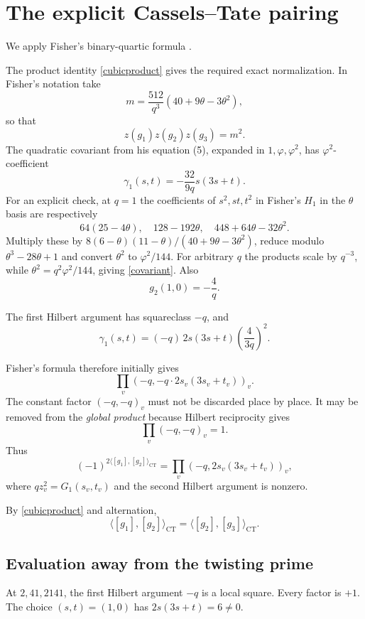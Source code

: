 \documentclass[11pt]{article}
\newcommand{\CT}{\mathrm{CT}}
\begin{document}
\section{The explicit Cassels--Tate pairing}

We apply Fisher's binary-quartic formula
\cite[Theorem 3.1 and Remark 3.2]{Fisher}.

The product identity \eqref{cubicproduct} gives the
required exact normalization. In Fisher's notation take
\[
m=\frac{512}{q^3}(40+9\theta-3\theta^2),
\]
so that
\[
z(g_1)z(g_2)z(g_3)=m^2.
\]
The quadratic covariant from his equation (5),
expanded in $1,\varphi,\varphi^2$, has
$\varphi^2$-coefficient
\begin{equation}\label{covariant}
\gamma_1(s,t)=-\frac{32}{9q}s(3s+t).
\end{equation}
For an explicit check, at $q=1$ the coefficients of $s^2,st,t^2$ in Fisher's $H_1$ in the $\theta$ basis are respectively
\[
64(25-4\theta),\quad 128-192\theta,\quad 448+64\theta-32\theta^2.
\]
Multiply these by $8(6-\theta)(11-\theta)/(40+9\theta-3\theta^2)$, reduce modulo $\theta^3-28\theta+1$ and convert $\theta^2$ to $\varphi^2/144$. For arbitrary $q$ the products scale by $q^{-3}$, while $\theta^2=q^2\varphi^2/144$, giving \eqref{covariant}.
Also
\[
g_2(1,0)=-\frac4q.
\]

The first Hilbert argument has squareclass $-q$,
and
\[
\gamma_1(s,t)=
(-q)\,2s(3s+t)
\left(\frac4{3q}\right)^2.
\]

Fisher's formula therefore initially gives
\[
\prod_v(-q,-q\cdot2s_v(3s_v+t_v))_v.
\]
The constant factor $(-q,-q)_v$ must not be
discarded place by place. It may be removed
from the \emph{global product} because Hilbert
reciprocity gives
\[
\prod_v(-q,-q)_v=1.
\]
Thus
\begin{equation}\label{hilbertproduct}
(-1)^{2\langle[g_1],[g_2]\rangle_{\CT}}
=\prod_v(-q,2s_v(3s_v+t_v))_v,
\end{equation}
where $qz_v^2=G_1(s_v,t_v)$ and the second
Hilbert argument is nonzero.

By \eqref{cubicproduct} and alternation,
\[
\langle[g_1],[g_2]\rangle_{\CT}
=\langle[g_2],[g_3]\rangle_{\CT}.
\]

\subsection{Evaluation away from the twisting prime}

At $2,41,2141$, the first Hilbert argument
$-q$ is a local square. Every factor is $+1$.
The choice $(s,t)=(1,0)$ has
$2s(3s+t)=6\ne0$.
\end{document}

